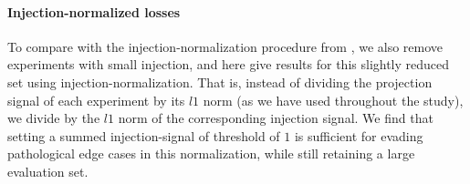 \newpage

\paragraph{Injection-normalized losses}

To compare with the injection-normalization procedure from \citet{Knox2019-ot}, we also remove experiments with small injection, and here give results for this slightly reduced set using injection-normalization.
That is, instead of dividing the projection signal of each experiment by its $l1$ norm (as we have used throughout the study), we divide by the $l1$ norm of the corresponding injection signal.
We find that setting a summed injection-signal of threshold of $1$ is sufficient for evading pathological edge cases in this normalization, while still retaining a large evaluation set.

